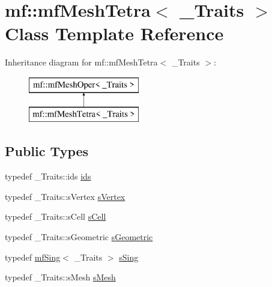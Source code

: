 \hypertarget{classmf_1_1mfMeshTetra}{
\section{mf::mfMeshTetra$<$ \_\-Traits $>$ Class Template Reference}
\label{classmf_1_1mfMeshTetra}
}
Inheritance diagram for mf::mfMeshTetra$<$ \_\-Traits $>$:\begin{figure}[H]
\begin{center}
\leavevmode
\includegraphics[height=2.000000cm]{classmf_1_1mfMeshTetra}
\end{center}
\end{figure}
\subsection*{Public Types}
\begin{DoxyCompactItemize}
\item 
typedef \_\-Traits::ids \hyperlink{classmf_1_1mfMeshTetra_adbcfde79b2f9076ed56ea0e373508967}{ids}
\item 
typedef \_\-Traits::sVertex \hyperlink{classmf_1_1mfMeshTetra_af6163ef8da6cda46de096af87fd82a55}{sVertex}
\item 
typedef \_\-Traits::sCell \hyperlink{classmf_1_1mfMeshTetra_a3d0b16a5e1666b21e408c3f2e6beac3d}{sCell}
\item 
typedef \_\-Traits::sGeometric \hyperlink{classmf_1_1mfMeshTetra_aebc07dc4fa46c943b52b4fead1a7927c}{sGeometric}
\item 
typedef \hyperlink{classmf_1_1mfSing}{mfSing}$<$ \_\-Traits $>$ \hyperlink{classmf_1_1mfMeshTetra_a85faa5c67167ee9364e5940f320a2693}{sSing}
\item 
typedef \_\-Traits::sMesh \hyperlink{classmf_1_1mfMeshTetra_a1b1ccf8633127e7307c35b150a522193}{sMesh}
\end{DoxyCompactItemize}
